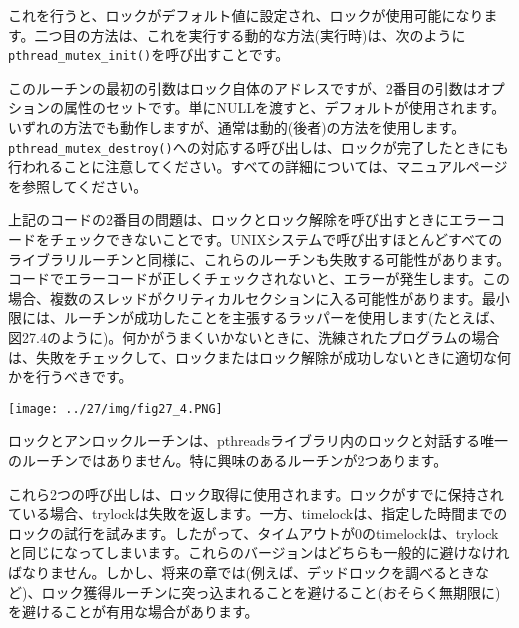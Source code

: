 これを行うと、ロックがデフォルト値に設定され、ロックが使用可能になります。二つ目の方法は、これを実行する動的な方法(実行時)は、次のように\texttt{pthread\_mutex\_init()}を呼び出すことです。

\begin{Shaded}
\begin{Highlighting}[]
\NormalTok{); }
\end{Highlighting}
\end{Shaded}

このルーチンの最初の引数はロック自体のアドレスですが、2番目の引数はオプションの属性のセットです。単にNULLを渡すと、デフォルトが使用されます。いずれの方法でも動作しますが、通常は動的(後者)の方法を使用します。\texttt{pthread\_mutex\_destroy()}への対応する呼び出しは、ロックが完了したときにも行われることに注意してください。すべての詳細については、マニュアルページを参照してください。

上記のコードの2番目の問題は、ロックとロック解除を呼び出すときにエラーコードをチェックできないことです。UNIXシステムで呼び出すほとんどすべてのライブラリルーチンと同様に、これらのルーチンも失敗する可能性があります。コードでエラーコードが正しくチェックされないと、エラーが発生します。この場合、複数のスレッドがクリティカルセクションに入る可能性があります。最小限には、ルーチンが成功したことを主張するラッパーを使用します(たとえば、図27.4のように)。何かがうまくいかないときに、洗練されたプログラムの場合は、失敗をチェックして、ロックまたはロック解除が成功しないときに適切な何かを行うべきです。

\texttt{[image: ../27/img/fig27\_4.PNG]}

ロックとアンロックルーチンは、pthreadsライブラリ内のロックと対話する唯一のルーチンではありません。特に興味のあるルーチンが2つあります。

\begin{Shaded}
\begin{Highlighting}[]
\end{Highlighting}
\end{Shaded}

これら2つの呼び出しは、ロック取得に使用されます。ロックがすでに保持されている場合、trylockは失敗を返します。一方、timelockは、指定した時間までのロックの試行を試みます。したがって、タイムアウトが0のtimelockは、trylockと同じになってしまいます。これらのバージョンはどちらも一般的に避けなければなりません。しかし、将来の章では(例えば、デッドロックを調べるときなど)、ロック獲得ルーチンに突っ込まれることを避けること(おそらく無期限に)を避けることが有用な場合があります。

